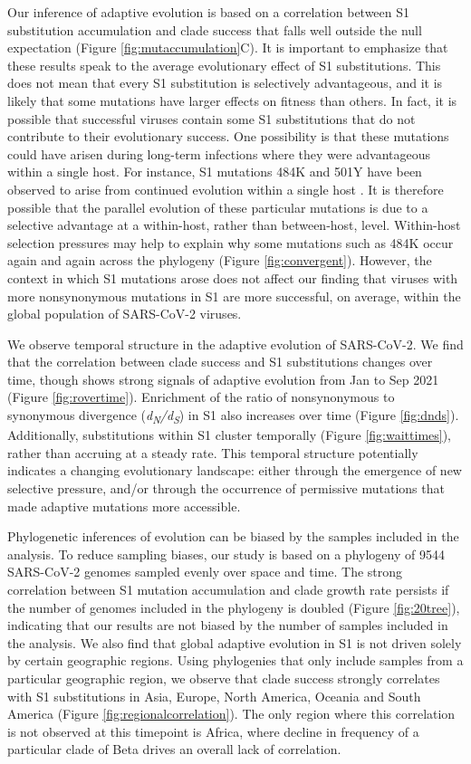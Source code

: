 \documentclass[11pt,oneside,letterpaper]{article}
\newcommand{\dnds}{\emph{d\textsubscript{N}/d\textsubscript{S}}}
\begin{document}
Our inference of adaptive evolution is based on a correlation between S1 substitution accumulation and clade success that falls well outside the null expectation (Figure \ref{fig:mutaccumulation}C).
It is important to emphasize that these results speak to the average evolutionary effect of S1 substitutions.
This does not mean that every S1 substitution is selectively advantageous, and it is likely that some mutations have larger effects on fitness than others.
In fact, it is possible that successful viruses contain some S1 substitutions that do not contribute to their evolutionary success.
One possibility is that these mutations could have arisen during long-term infections where they were advantageous within a single host.
For instance, S1 mutations 484K and 501Y have been observed to arise from continued evolution within a single host \cite{Choi2020-to}.
It is therefore possible that the parallel evolution of these particular mutations is due to a selective advantage at a within-host, rather than between-host, level.
Within-host selection pressures may help to explain why some mutations such as 484K occur again and again across the phylogeny (Figure \ref{fig:convergent}).
However, the context in which S1 mutations arose does not affect our finding that viruses with more nonsynonymous mutations in S1 are more successful, on average, within the global population of SARS-CoV-2 viruses.

We observe temporal structure in the adaptive evolution of SARS-CoV-2.
We find that the correlation between clade success and S1 substitutions changes over time, though shows strong signals of adaptive evolution from Jan to Sep 2021 (Figure \ref{fig:rovertime}).
Enrichment of the ratio of nonsynonymous to synonymous divergence (\dnds{}) in S1 also increases over time (Figure \ref{fig:dnds}).
Additionally, substitutions within S1 cluster temporally (Figure \ref{fig:waittimes}), rather than accruing at a steady rate.
This temporal structure potentially indicates a changing evolutionary landscape: either through the emergence of new selective pressure, and/or through the occurrence of permissive mutations that made adaptive mutations more accessible.

Phylogenetic inferences of evolution can be biased by the samples included in the analysis.
To reduce sampling biases, our study is based on a phylogeny of 9544 SARS-CoV-2 genomes sampled evenly over space and time.
The strong correlation between S1 mutation accumulation and clade growth rate persists if the number of genomes included in the phylogeny is doubled (Figure \ref{fig:20tree}), indicating that our results are not biased by the number of samples included in the analysis.
We also find that global adaptive evolution in S1 is not driven solely by certain geographic regions.
Using phylogenies that only include samples from a particular geographic region, we observe that clade success strongly correlates with S1 substitutions in Asia, Europe, North America, Oceania and South America (Figure \ref{fig:regionalcorrelation}).
The only region where this correlation is not observed at this timepoint is Africa, where decline in frequency of a particular clade of Beta drives an overall lack of correlation.
\end{document}

